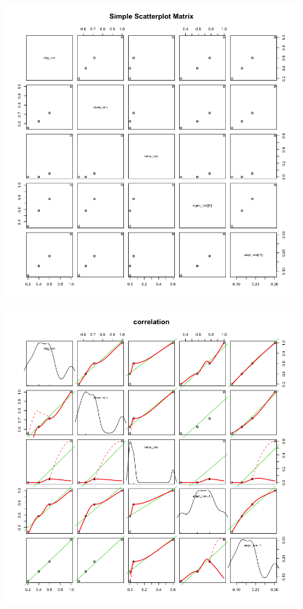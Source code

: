 \documentclass[a4paper]{article}
\begin{document}
\begin{figure}[ht!]
	\centering
	 \label{tab:figure}
	\includegraphics[scale=0.5]{Fig1.png}
\end{figure}

\begin{figure}[ht!]
	\centering
	 \label{tab:figure}
	\includegraphics[scale=0.5]{Fig2.png}
\end{figure}
\end{document}
